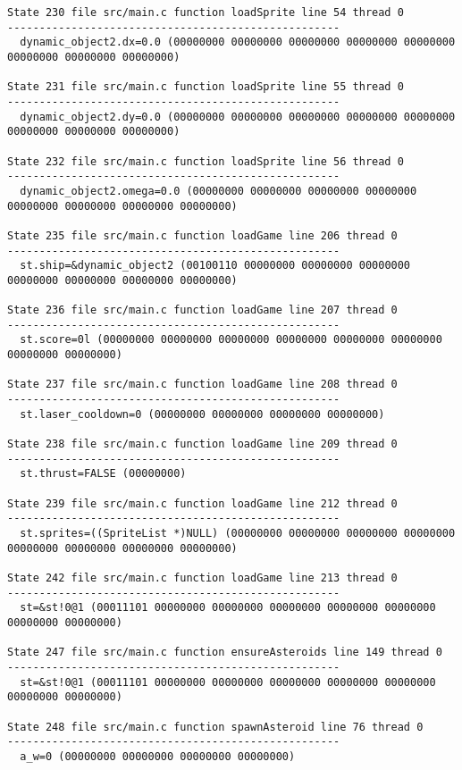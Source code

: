 \begin{verbatim}
State 230 file src/main.c function loadSprite line 54 thread 0
----------------------------------------------------
  dynamic_object2.dx=0.0 (00000000 00000000 00000000 00000000 00000000 00000000 00000000 00000000)

State 231 file src/main.c function loadSprite line 55 thread 0
----------------------------------------------------
  dynamic_object2.dy=0.0 (00000000 00000000 00000000 00000000 00000000 00000000 00000000 00000000)

State 232 file src/main.c function loadSprite line 56 thread 0
----------------------------------------------------
  dynamic_object2.omega=0.0 (00000000 00000000 00000000 00000000 00000000 00000000 00000000 00000000)

State 235 file src/main.c function loadGame line 206 thread 0
----------------------------------------------------
  st.ship=&dynamic_object2 (00100110 00000000 00000000 00000000 00000000 00000000 00000000 00000000)

State 236 file src/main.c function loadGame line 207 thread 0
----------------------------------------------------
  st.score=0l (00000000 00000000 00000000 00000000 00000000 00000000 00000000 00000000)

State 237 file src/main.c function loadGame line 208 thread 0
----------------------------------------------------
  st.laser_cooldown=0 (00000000 00000000 00000000 00000000)

State 238 file src/main.c function loadGame line 209 thread 0
----------------------------------------------------
  st.thrust=FALSE (00000000)

State 239 file src/main.c function loadGame line 212 thread 0
----------------------------------------------------
  st.sprites=((SpriteList *)NULL) (00000000 00000000 00000000 00000000 00000000 00000000 00000000 00000000)

State 242 file src/main.c function loadGame line 213 thread 0
----------------------------------------------------
  st=&st!0@1 (00011101 00000000 00000000 00000000 00000000 00000000 00000000 00000000)

State 247 file src/main.c function ensureAsteroids line 149 thread 0
----------------------------------------------------
  st=&st!0@1 (00011101 00000000 00000000 00000000 00000000 00000000 00000000 00000000)

State 248 file src/main.c function spawnAsteroid line 76 thread 0
----------------------------------------------------
  a_w=0 (00000000 00000000 00000000 00000000)


\end{verbatim}
